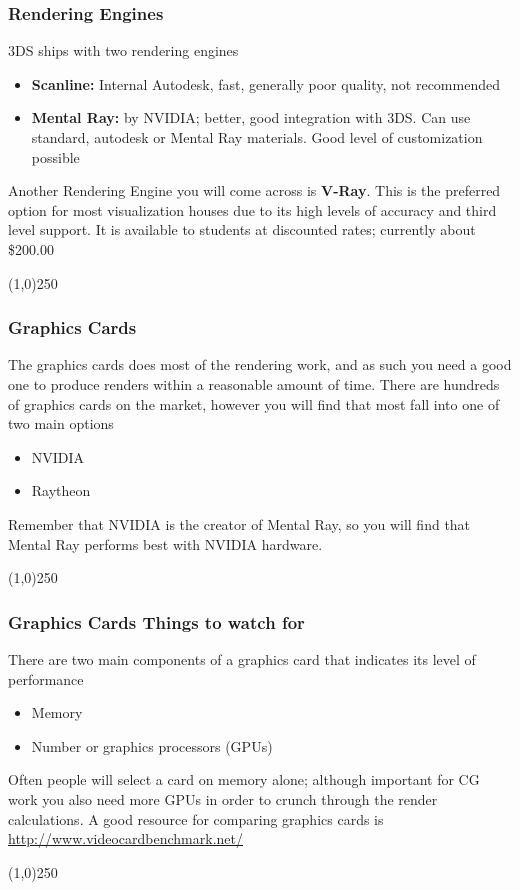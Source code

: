 \begin{frame}
\frametitle{Rendering Engines}
3DS ships with two rendering engines
\begin{itemize}
	\item \textbf{Scanline:} Internal Autodesk, fast, generally poor quality, not recommended
	\item \textbf{Mental Ray:} by NVIDIA; better, good integration with 3DS.  Can use standard, autodesk or Mental Ray materials.  Good level of customization possible
\end{itemize}
Another Rendering Engine you will come across is \textbf{V-Ray}. This is the preferred option for most visualization houses due to its high levels of accuracy and third level support.  It is available to students at discounted rates; currently about \$200.00
\end{frame}
\begin{center}\line(1,0){250}\end{center}



\begin{frame}
\frametitle{Graphics Cards}
The graphics cards does most of the rendering work, and as such you need a good one to produce renders within a reasonable amount of time.  There are hundreds of graphics cards on the market, however you will find that most fall into one of two main options
\begin{itemize}
	\item NVIDIA
	\item Raytheon
\end{itemize}
Remember that NVIDIA is the creator of Mental Ray, so you will find that Mental Ray performs best with NVIDIA hardware.
\end{frame}
\begin{center}\line(1,0){250}\end{center}


\begin{frame}
\frametitle{Graphics Cards \hfill\hfill Things to watch for}
There are two main components of a graphics card that indicates its level of performance
\begin{itemize}
	\item Memory
	\item Number or graphics processors (GPUs)
\end{itemize}
Often people will select a card on memory alone; although important for CG work you also need more GPUs in order to crunch through the render calculations.  A good resource for comparing graphics cards is \href{http://www.videocardbenchmark.net/}{http://www.videocardbenchmark.net/}
\end{frame}
\begin{center}\line(1,0){250}\end{center}



